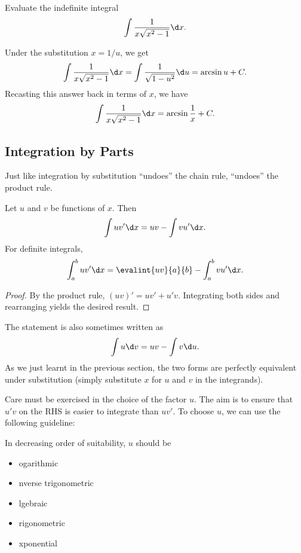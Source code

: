 \begin{sample}
    Evaluate the indefinite integral \[\int \frac1{x\sqrt{x^2 - 1}} \d x.\]
\end{sample}
\begin{sampans}
    Under the substitution $x = 1/u$, we get \[\int \frac1{x\sqrt{x^2 - 1}} \d x = \int \frac1{\sqrt{1 - u^2}} \d u = \arcsin u + C.\] Recasting this answer back in terms of $x$, we have \[\int \frac1{x\sqrt{x^2 - 1}} \d x = \arcsin \frac1x + C.\] 
\end{sampans}

\subsection{Integration by Parts}

Just like integration by substitution ``undoes'' the chain rule,  ``undoes'' the product rule.

\begin{proposition}
    Let $u$ and $v$ be functions of $x$. Then \[\int u v' \d x = uv - \int v u' \d x.\] For definite integrals, \[\int_a^b u v' \d x = \evalint{uv}{a}{b} - \int_a^b v u' \d x.\]
\end{proposition}
\begin{proof}
    By the product rule, $(uv)' = uv' + u'v$. Integrating both sides and rearranging yields the desired result.
\end{proof}

The statement is also sometimes written as \[\int u \d v = uv - \int v \d u.\] As we just learnt in the previous section, the two forms are perfectly equivalent under substitution (simply substitute $x$ for $u$ and $v$ in the integrands).

Care must be exercised in the choice of the factor $u$. The aim is to ensure that $u' v$ on the RHS is easier to integrate than $u v'$. To choose $u$, we can use the following guideline:

\begin{recipe}[LIATE]
    In decreasing order of suitability, $u$ should be
    \begin{itemize}
        \item {}ogarithmic
        \item {}nverse trigonometric
        \item {}lgebraic
        \item {}rigonometric
        \item {}xponential
    \end{itemize}
\end{recipe}

